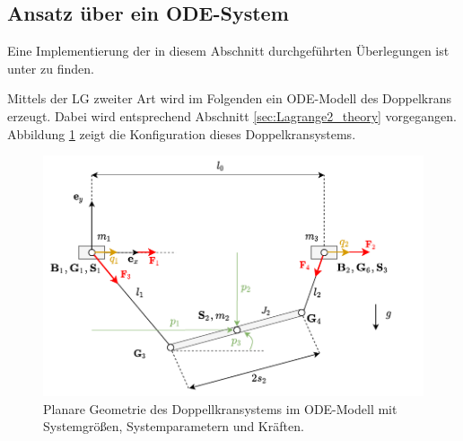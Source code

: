 \subsection{Ansatz über ein ODE-System}
\label{subsec:double_crane_lagrange2}
Eine Implementierung der in diesem Abschnitt durchgeführten Überlegungen ist unter \cite[flatness\_notebooks/ODE\_flatness\_analysis.ipynb]{SAGithub} zu finden.

Mittels der LG zweiter Art wird im Folgenden ein ODE-Modell des Doppelkrans erzeugt. Dabei wird entsprechend Abschnitt \ref{sec:Lagrange2_theory} vorgegangen. Abbildung \ref{fig:double_crane_diagram} zeigt die Konfiguration dieses Doppelkransystems.

\begin{figure}[ht]
	\begin{center}
		\includegraphics[scale=1]{Pictures/ODE_flatness_analysis_double_crane_diagram}
	\end{center}
	\caption[Planare Geometrie des Doppellkransystems im ODE-Modell]
	{Planare Geometrie des Doppellkransystems im ODE-Modell mit Systemgrößen, Systemparametern und Kräften.}
	\label{fig:double_crane_diagram}
\end{figure}


